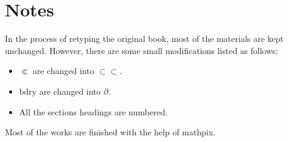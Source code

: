 \chapter*{Notes}

In the process of retyping the original book,
most of the materials are kept unchanged.
However, there are some small modifications listed as follows:

\begin{itemize}
  \item $\Subset$  are changed into $\subset\subset$.
  \item $\text{bdry}$ are changed into $\partial$.
  \item All the sections headings are numbered.
\end{itemize}

Most of the works are finished with the help of mathpix.